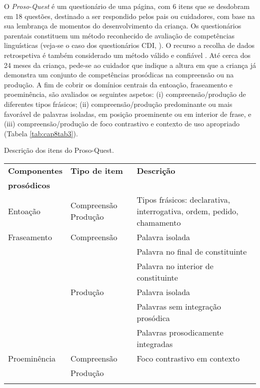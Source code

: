 \documentclass[output=paper,colorlinks,citecolor=brown,booklanguage=portuguese]{langscibook}
\begin{document}
O \emph{Proso-Quest} é um questionário de uma página, com 6 itens que se desdobram em 18 questões, destinado a ser respondido pelos pais ou cuidadores, com base na sua lembrança de momentos do desenvolvimento da criança. Os questionários parentais constituem um método reconhecido de avaliação de competências linguísticas (veja-se o caso dos questionários CDI, \citealp{Frota2016a}). O recurso a recolha de dados retrospetiva é também considerado um método válido e confiável \citep{Cameirao2010}. Até cerca dos 24 meses da criança, pede-se ao cuidador que indique a altura em que a criança já demonstra um conjunto de competências prosódicas na compreensão ou na produção. A fim de cobrir os domínios centrais da entoação, fraseamento e proeminência, são avaliados os seguintes aspetos: (i) compreensão/produção de diferentes tipos frásicos; (ii) compreensão/produção predominante ou mais favorável de palavras isoladas, em posição proeminente ou em interior de frase, e (iii) compreensão/produção de foco contrastivo e contexto de uso apropriado (Tabela \ref{tab:cap8tab3}).



\begin{Tabela}
\caption{Descrição dos itens do Proso-Quest.}
\label{tab:cap8tab3}


\begin{tabularx}{\textwidth}{p{2.5cm}p{2.5cm}Q}
\lsptoprule
\textbf{Componentes}&	\textbf{Tipo de item} &	\textbf{Descrição} \\
\textbf{prosódicos}&&\\
\midrule
Entoação&	Compreensão	Produção &Tipos frásicos: declarativa, {interrogativa}, ordem, pedido, chamamento\\
\midrule
Fraseamento	&Compreensão&	Palavra isolada\\
&&Palavra no final de constituinte\\ && Palavra no interior de constituinte\\
& 	Produção&	Palavra isolada\\
&&Palavras sem integração prosódica\\
&&Palavras prosodicamente {integradas}\\
\midrule
Proeminência&	Compreensão	&Foco contrastivo em contexto\\
& Produção &\\
\lspbottomrule
\end{tabularx}
\end{Tabela}
\end{document}
